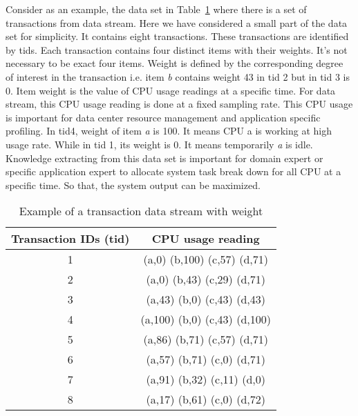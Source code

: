 \par
Consider as an example, the data set in Table~\ref{tab:Table} where there is a set of transactions from data stream. Here we have considered a small part of the data set for simplicity. It contains eight transactions. These transactions are identified by tids. Each transaction contains four distinct items with their weights. It’s not necessary to be exact four items. Weight is defined by the corresponding degree of interest in the transaction i.e. item {\it b} contains weight 43 in tid 2 but in tid 3 is 0. Item weight is the value of CPU usage readings at a specific time. For data stream, this CPU usage reading is done at a fixed sampling rate. This CPU usage is important for data center resource management and application specific profiling. In tid4, weight of item {\it a} is 100. It means CPU a is working at high usage rate. While in tid 1, its weight is 0. It means temporarily {\it a} is idle. Knowledge extracting from this data set is important for domain expert or specific application expert to allocate system task break down for all CPU at a specific time.  So that, the system output can be maximized.
%

\begin{table}
\begin{center}
\begin{tabular}{ |c|c| } 
\hline
Transaction IDs (tid) & CPU usage reading \\
\hline
1 & (a,0) (b,100) (c,57) (d,71)\\
2 & (a,0) (b,43) (c,29) (d,71)\\
3 & (a,43) (b,0) (c,43) (d,43)\\
4 & (a,100) (b,0) (c,43) (d,100)\\
5 & (a,86) (b,71) (c,57) (d,71)\\
6 & (a,57) (b,71) (c,0) (d,71)\\
7 & (a,91) (b,32) (c,11) (d,0)\\
8 & (a,17) (b,61) (c,0) (d,72)\\
\hline
\end{tabular}
\caption{Example of a transaction data stream with weight}
\label{tab:Table}
\end{center}
\end{table}


